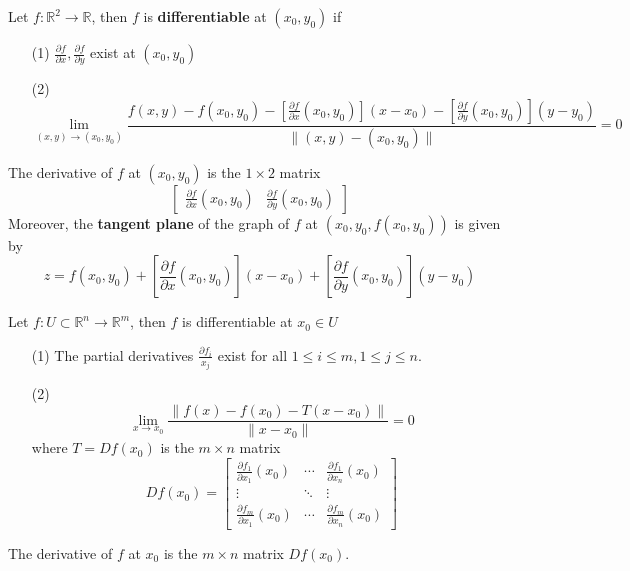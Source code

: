 \documentclass[openany]{book}
\newcommand{\R}{\mathbb{R}}
\begin{document}
\begin{defn}
    Let $f:\R^2\to\R$, then $f$ is \textbf{differentiable} at $(x_0,y_0)$ if 
    \begin{enumerate}
        \item[(1)] $\frac{\partial f}{\partial x},\frac{\partial f}{\partial y}$ exist at $(x_0,y_0)$
        \item[(2)] 
        \begin{equation*}
            \lim_{(x,y)\to(x_0,y_0)}\frac{f(x,y)-f(x_0,y_0)-\left[\frac{\partial f}{\partial x}(x_0,y_0)\right](x-x_0)-\left[\frac{\partial f}{\partial y}(x_0,y_0)\right](y-y_0)}{\|(x,y)-(x_0,y_0)\|}=0
        \end{equation*}
    \end{enumerate}
    The derivative of $f$ at $(x_0,y_0)$ is the $1\times 2$ matrix 
    \begin{equation*}
        \begin{bmatrix}\frac{\partial f}{\partial x}(x_0,y_0)&\frac{\partial f}{\partial y}(x_0,y_0)\end{bmatrix}
    \end{equation*}
    Moreover, the \textbf{tangent plane} of the graph of $f$ at $(x_0,y_0, f(x_0,y_0))$ is given by 
    \begin{equation*}
        z=f(x_0,y_0)+\left[\frac{\partial f}{\partial x}(x_0,y_0)\right](x-x_0)+\left[\frac{\partial f}{\partial y}(x_0,y_0)\right](y-y_0)
    \end{equation*}
\end{defn}

\begin{defn}
    Let $f:U\subset\R^n\to\R^m$, then $f$ is differentiable at $x_0\in U$
    \begin{enumerate}
        \item[(1)] The partial derivatives $\frac{\partial f_i}{x_j}$ exist for all $1\leq i\leq m, 1\leq j\leq n$. 
        \item[(2)]
        \begin{equation*}
            \lim_{x\to x_0}\frac{\|f(x)-f(x_0)-T(x-x_0)\|}{\|x-x_0\|}=0
        \end{equation*}
        where $T=Df(x_0)$ is the $m\times n$ matrix 
        \begin{equation*}
            Df(x_0)=
            \begin{bmatrix}
            \frac{\partial f_1}{\partial x_1}(x_0) & \cdots & \frac{\partial f_1}{\partial x_n}(x_0) \\
            \vdots & \ddots & \vdots \\
            \frac{\partial f_m}{\partial x_1}(x_0) & \cdots & \frac{\partial f_m}{\partial x_n}(x_0)
            \end{bmatrix}
        \end{equation*}
    \end{enumerate}
    The derivative of $f$ at $x_0$ is the $m\times n$ matrix $Df(x_0)$.
\end{defn}
\end{document}
